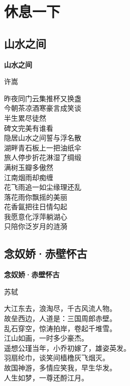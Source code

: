 \section{休息一下}

\subsection{山水之间}
\begin{center}
\textbf{山水之间}

{\kaishu 许嵩}

\vspace*{1em}
昨夜同门云集\quad 推杯又换盏\\
今朝茶凉酒寒\quad 豪言成笑谈\\
半生累\quad 尽徒然\\
碑文完美有谁看\\
隐居山水之间\quad 誓与浮名散\\

\vspace*{.6em}
湖畔青石板上\quad 一把油纸伞\\
旅人停步折花\quad 淋湿了绸缎\\
满树玉瓣多傲然\\
江南烟雨却痴缠\\
花飞雨追\quad 一如尘缘理还乱\\

\vspace*{.6em}
落花雨\quad 你飘摇的美丽\\
花香氤\quad 把往日情勾起\\
我愿意\quad 化浮萍躺湖心\\
只陪你\quad 泛岁月的涟漪
\end{center}

\subsection{念奴娇·赤壁怀古}

\begin{center}
\textbf{念奴娇·赤壁怀古}

{\kaishu 苏轼}

\vspace*{1em}
大江东去，浪淘尽，千古风流人物。\\
故垒西边，人道是：三国周郎赤壁。\\
乱石穿空，惊涛拍岸，卷起千堆雪。\\
江山如画，一时多少豪杰。\\

\vspace*{.8em}
遥想公瑾当年，小乔初嫁了，雄姿英发。\\
羽扇纶巾，谈笑间樯橹灰飞烟灭。\\
故国神游，多情应笑我，早生华发。\\
人生如梦，一尊还酹江月。

\end{center}

